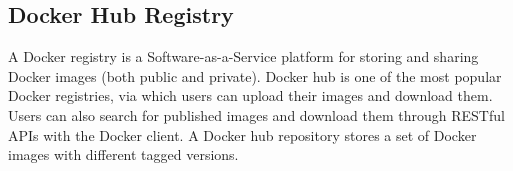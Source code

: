 









\subsection{Docker Hub Registry}

A Docker registry is a Software-as-a-Service platform for storing and sharing Docker images (both public and private). Docker hub is one of the most popular Docker registries, via which users can upload their images and download them. Users can also search for published images and download them through RESTful APIs with the Docker client. %
%
%
A Docker hub repository stores a set of Docker images with different tagged versions.
%

